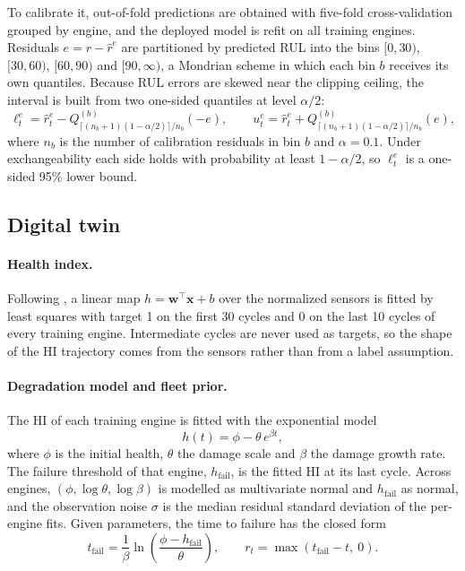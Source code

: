 \documentclass[preprint,12pt,authoryear]{elsarticle}
\begin{document}
To calibrate it, out-of-fold predictions are obtained with five-fold cross-validation grouped by engine, and the deployed model is refit on all training engines. Residuals $e = r - \hat r^{e}$ are partitioned by predicted RUL into the bins $[0,30)$, $[30,60)$, $[60,90)$ and $[90,\infty)$, a Mondrian scheme in which each bin $b$ receives its own quantiles. Because RUL errors are skewed near the clipping ceiling, the interval is built from two one-sided quantiles at level $\alpha/2$:
\begin{equation}
\ell^{e}_t = \hat r^{e}_t - Q^{(b)}_{\lceil (n_b+1)(1-\alpha/2)\rceil / n_b}(-e), \qquad
u^{e}_t = \hat r^{e}_t + Q^{(b)}_{\lceil (n_b+1)(1-\alpha/2)\rceil / n_b}(e),
\end{equation}
where $n_b$ is the number of calibration residuals in bin $b$ and $\alpha = 0.1$. Under exchangeability each side holds with probability at least $1-\alpha/2$, so $\ell^{e}_t$ is a one-sided 95\% lower bound.

\subsection{Digital twin}\label{sec:twin}
\paragraph{Health index.} Following \citet{wang2008similarity}, a linear map $h = \mathbf{w}^\top \mathbf{x} + b$ over the normalized sensors is fitted by least squares with target 1 on the first 30 cycles and 0 on the last 10 cycles of every training engine. Intermediate cycles are never used as targets, so the shape of the HI trajectory comes from the sensors rather than from a label assumption.

\paragraph{Degradation model and fleet prior.} The HI of each training engine is fitted with the exponential model \citep{gebraeel2005residual}
\begin{equation}
h(t) = \phi - \theta\, e^{\beta t},
\end{equation}
where $\phi$ is the initial health, $\theta$ the damage scale and $\beta$ the damage growth rate. The failure threshold of that engine, $h_{\mathrm{fail}}$, is the fitted HI at its last cycle. Across engines, $(\phi, \log\theta, \log\beta)$ is modelled as multivariate normal and $h_{\mathrm{fail}}$ as normal, and the observation noise $\sigma$ is the median residual standard deviation of the per-engine fits. Given parameters, the time to failure has the closed form
\begin{equation}
t_{\mathrm{fail}} = \frac{1}{\beta}\ln\!\left(\frac{\phi - h_{\mathrm{fail}}}{\theta}\right), \qquad r_t = \max(t_{\mathrm{fail}} - t,\ 0).
\end{equation}
\end{document}
